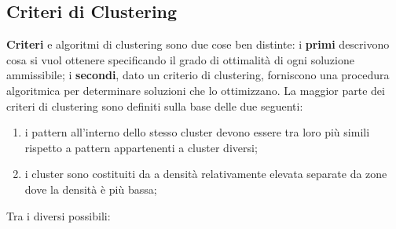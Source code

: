 \subsection{Criteri di Clustering}\label{sub:criteri_di_clustering} %
\textbf{Criteri} e algoritmi di clustering sono due cose ben distinte: i \textbf{primi} descrivono cosa si vuol ottenere specificando il grado di ottimalità di ogni soluzione ammissibile; i \textbf{secondi}, dato un criterio di clustering, forniscono una procedura algoritmica per determinare soluzioni che lo ottimizzano.
\emptyln{}
La maggior parte dei criteri di clustering sono definiti sulla base delle due  seguenti:
\begin{enumerate}
    \item i pattern all'interno dello stesso cluster devono essere tra loro più simili rispetto a pattern appartenenti a cluster diversi;
    \item i cluster sono costituiti da  a densità relativamente elevata separate da zone dove la densità è più bassa;
\end{enumerate}
Tra i diversi  possibili:
